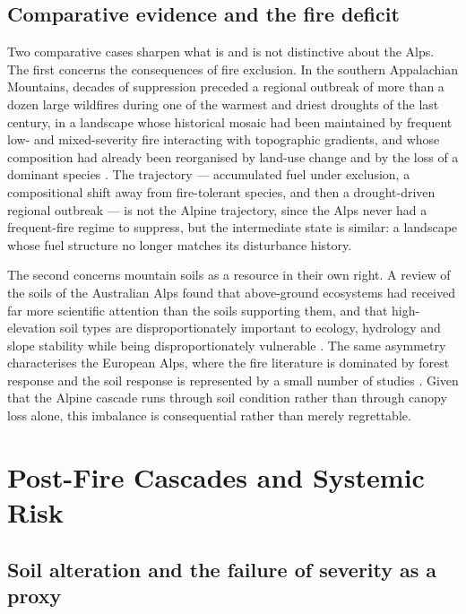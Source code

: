 \documentclass[11pt,a4paper]{article}
\begin{document}
\subsection{Comparative evidence and the fire deficit}

Two comparative cases sharpen what is and is not distinctive about the Alps. The first concerns the consequences of fire exclusion. In the southern Appalachian Mountains, decades of suppression preceded a regional outbreak of more than a dozen large wildfires during one of the warmest and driest droughts of the last century, in a landscape whose historical mosaic had been maintained by frequent low- and mixed-severity fire interacting with topographic gradients, and whose composition had already been reorganised by land-use change and by the loss of a dominant species \citep{reilly_drivers_2022}. The trajectory --- accumulated fuel under exclusion, a compositional shift away from fire-tolerant species, and then a drought-driven regional outbreak --- is not the Alpine trajectory, since the Alps never had a frequent-fire regime to suppress, but the intermediate state is similar: a landscape whose fuel structure no longer matches its disturbance history.

The second concerns mountain soils as a resource in their own right. A review of the soils of the Australian Alps found that above-ground ecosystems had received far more scientific attention than the soils supporting them, and that high-elevation soil types are disproportionately important to ecology, hydrology and slope stability while being disproportionately vulnerable \citep{wilson_distribution_2022}. The same asymmetry characterises the European Alps, where the fire literature is dominated by forest response and the soil response is represented by a small number of studies \citep{negri_wildfire_2026}. Given that the Alpine cascade runs through soil condition rather than through canopy loss alone, this imbalance is consequential rather than merely regrettable.


\section{Post-Fire Cascades and Systemic Risk}
\label{sec:cascade}

\subsection{Soil alteration and the failure of severity as a proxy}
\end{document}
